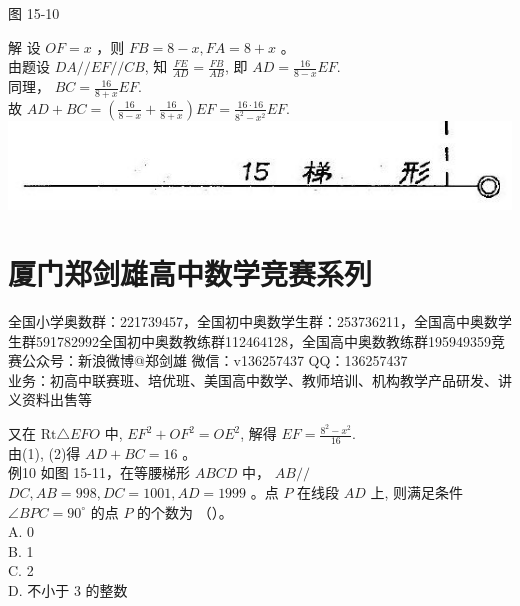\documentclass[10pt]{article}
\begin{document}
图 15-10

解 设 $O F=x$ ，则 $F B=8-x, F A=8+x$ 。\\
由题设 $D A / / E F / / C B$, 知 $\frac{F E}{A D}=\frac{F B}{A B}$, 即 $A D=\frac{16}{8-x} E F$.\\
同理， $B C=\frac{16}{8+x} E F$.\\
故 $A D+B C=\left(\frac{16}{8-x}+\frac{16}{8+x}\right) E F=\frac{16 \cdot 16}{8^{2}-x^{2}} E F$.\\
\includegraphics[max width=\textwidth, center]{2024_10_30_2c8f45efd4a519b08e1ag-141}

\section*{厦门郑剑雄高中数学竞赛系列}
全国小学奥数群：221739457，全国初中奥数学生群：253736211，全国高中奥数学生群591782992全国初中奥数教练群112464128，全国高中奥数教练群195949359竞赛公众号：新浪微博@郑剑雄 微信：v136257437 QQ：136257437\\
业务：初高中联赛班、培优班、美国高中数学、教师培训、机构教学产品研发、讲义资料出售等

又在 $\mathrm{Rt} \triangle E F O$ 中, $E F^{2}+O F^{2}=O E^{2}$, 解得 $E F=\frac{8^{2}-x^{2}}{16}$.\\
由(1), (2)得 $A D+B C=16$ 。\\
例10 如图 15-11，在等腰梯形 $A B C D$ 中， $A B / /$ $D C, A B=998, D C=1001, A D=1999$ 。点 $P$ 在线段 $A D$ 上, 则满足条件 $\angle B P C=90^{\circ}$ 的点 $P$ 的个数为 （）。\\
A. 0\\
B. 1\\
C. 2\\
D. 不小于 3 的整数
\end{document}
